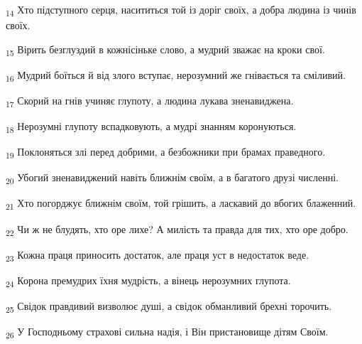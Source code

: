 \begin{tcolorbox}
\textsubscript{14} Хто підступного серця, насититься той із доріг своїх, а добра людина із чинів своїх.
\end{tcolorbox}
\begin{tcolorbox}
\textsubscript{15} Вірить безглуздий в кожнісіньке слово, а мудрий зважає на кроки свої.
\end{tcolorbox}
\begin{tcolorbox}
\textsubscript{16} Мудрий боїться й від злого вступає, нерозумний же гнівається та сміливий.
\end{tcolorbox}
\begin{tcolorbox}
\textsubscript{17} Скорий на гнів учиняє глупоту, а людина лукава зненавиджена.
\end{tcolorbox}
\begin{tcolorbox}
\textsubscript{18} Нерозумні глупоту вспадковують, а мудрі знанням коронуються.
\end{tcolorbox}
\begin{tcolorbox}
\textsubscript{19} Поклоняться злі перед добрими, а безбожники при брамах праведного.
\end{tcolorbox}
\begin{tcolorbox}
\textsubscript{20} Убогий зненавиджений навіть ближнім своїм, а в багатого друзі численні.
\end{tcolorbox}
\begin{tcolorbox}
\textsubscript{21} Хто погорджує ближнім своїм, той грішить, а ласкавий до вбогих блаженний.
\end{tcolorbox}
\begin{tcolorbox}
\textsubscript{22} Чи ж не блудять, хто оре лихе? А милість та правда для тих, хто оре добро.
\end{tcolorbox}
\begin{tcolorbox}
\textsubscript{23} Кожна праця приносить достаток, але праця уст в недостаток веде.
\end{tcolorbox}
\begin{tcolorbox}
\textsubscript{24} Корона премудрих їхня мудрість, а вінець нерозумних глупота.
\end{tcolorbox}
\begin{tcolorbox}
\textsubscript{25} Свідок правдивий визволює душі, а свідок обманливий брехні торочить.
\end{tcolorbox}
\begin{tcolorbox}
\textsubscript{26} У Господньому страхові сильна надія, і Він пристановище дітям Своїм.
\end{tcolorbox}
